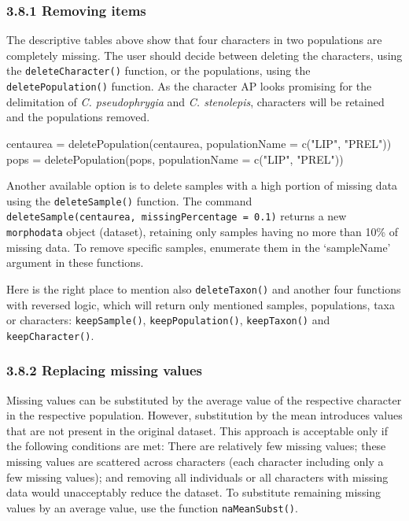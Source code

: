 \documentclass[
  11pt,
  a4paper]{article}
\newenvironment{Shaded}{\begin{snugshade}}{\end{snugshade}}
\newcommand{\AttributeTok}[1]{\textcolor[rgb]{0.77,0.63,0.00}{#1}}
\newcommand{\FunctionTok}[1]{\textcolor[rgb]{0.00,0.00,0.00}{#1}}
\newcommand{\NormalTok}[1]{#1}
\newcommand{\OtherTok}[1]{\textcolor[rgb]{0.56,0.35,0.01}{#1}}
\newcommand{\StringTok}[1]{\textcolor[rgb]{0.31,0.60,0.02}{#1}}
\begin{document}
\hypertarget{removing-items}{%
\subsubsection{3.8.1 Removing items}\label{removing-items}}

The descriptive tables above show that four characters in two
populations are completely missing. The user should decide between
deleting the characters, using the \texttt{deleteCharacter()} function,
or the populations, using the \texttt{deletePopulation()} function. As
the character AP looks promising for the delimitation of \emph{C.
pseudophrygia} and \emph{C. stenolepis}, characters will be retained and
the populations removed.

\begin{Shaded}
\begin{Highlighting}[]
\NormalTok{centaurea }\OtherTok{=} \FunctionTok{deletePopulation}\NormalTok{(centaurea, }\AttributeTok{populationName =} \FunctionTok{c}\NormalTok{(}\StringTok{"LIP"}\NormalTok{, }\StringTok{"PREL"}\NormalTok{))}
\NormalTok{pops }\OtherTok{=} \FunctionTok{deletePopulation}\NormalTok{(pops, }\AttributeTok{populationName =} \FunctionTok{c}\NormalTok{(}\StringTok{"LIP"}\NormalTok{, }\StringTok{"PREL"}\NormalTok{))}
\end{Highlighting}
\end{Shaded}

Another available option is to delete samples with a high portion of
missing data using the \texttt{deleteSample()} function. The command
\texttt{deleteSample(centaurea,\ missingPercentage\ =\ 0.1)} returns a
new \texttt{morphodata} object (dataset), retaining only samples having
no more than 10\% of missing data. To remove specific samples, enumerate
them in the `sampleName' argument in these functions.

Here is the right place to mention also \texttt{deleteTaxon()} and
another four functions with reversed logic, which will return only
mentioned samples, populations, taxa or characters:
\texttt{keepSample()}, \texttt{keepPopulation()}, \texttt{keepTaxon()}
and \texttt{keepCharacter()}.

\hypertarget{replacing-missing-values}{%
\subsubsection{3.8.2 Replacing missing
values}\label{replacing-missing-values}}

Missing values can be substituted by the average value of the respective
character in the respective population. However, substitution by the
mean introduces values that are not present in the original dataset.
This approach is acceptable only if the following conditions are met:
There are relatively few missing values; these missing values are
scattered across characters (each character including only a few missing
values); and removing all individuals or all characters with missing
data would unacceptably reduce the dataset. To substitute remaining
missing values by an average value, use the function
\texttt{naMeanSubst()}.
\end{document}
